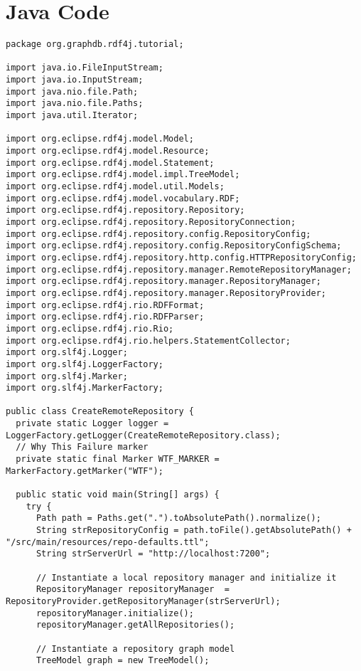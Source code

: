 \documentclass{amsart}
\begin{document}
  \section{Java Code}
  \begin{small}
   \begin{verbatim}
package org.graphdb.rdf4j.tutorial;

import java.io.FileInputStream;
import java.io.InputStream;
import java.nio.file.Path;
import java.nio.file.Paths;
import java.util.Iterator;

import org.eclipse.rdf4j.model.Model;
import org.eclipse.rdf4j.model.Resource;
import org.eclipse.rdf4j.model.Statement;
import org.eclipse.rdf4j.model.impl.TreeModel;
import org.eclipse.rdf4j.model.util.Models;
import org.eclipse.rdf4j.model.vocabulary.RDF;
import org.eclipse.rdf4j.repository.Repository;
import org.eclipse.rdf4j.repository.RepositoryConnection;
import org.eclipse.rdf4j.repository.config.RepositoryConfig;
import org.eclipse.rdf4j.repository.config.RepositoryConfigSchema;
import org.eclipse.rdf4j.repository.http.config.HTTPRepositoryConfig;
import org.eclipse.rdf4j.repository.manager.RemoteRepositoryManager;
import org.eclipse.rdf4j.repository.manager.RepositoryManager;
import org.eclipse.rdf4j.repository.manager.RepositoryProvider;
import org.eclipse.rdf4j.rio.RDFFormat;
import org.eclipse.rdf4j.rio.RDFParser;
import org.eclipse.rdf4j.rio.Rio;
import org.eclipse.rdf4j.rio.helpers.StatementCollector;
import org.slf4j.Logger;
import org.slf4j.LoggerFactory;
import org.slf4j.Marker;
import org.slf4j.MarkerFactory;

public class CreateRemoteRepository {
  private static Logger logger = LoggerFactory.getLogger(CreateRemoteRepository.class);
  // Why This Failure marker
  private static final Marker WTF_MARKER = MarkerFactory.getMarker("WTF");
	
  public static void main(String[] args) {
    try {		
      Path path = Paths.get(".").toAbsolutePath().normalize();
      String strRepositoryConfig = path.toFile().getAbsolutePath() + "/src/main/resources/repo-defaults.ttl";
      String strServerUrl = "http://localhost:7200";
		
      // Instantiate a local repository manager and initialize it
      RepositoryManager repositoryManager  = RepositoryProvider.getRepositoryManager(strServerUrl);
      repositoryManager.initialize();
      repositoryManager.getAllRepositories();

      // Instantiate a repository graph model
      TreeModel graph = new TreeModel();


\end{verbatim}
\end{small}
\end{document}
